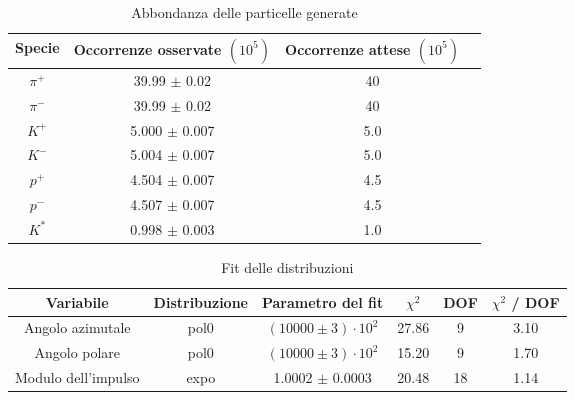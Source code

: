 \documentclass[a4paper,10pt,twocolumn]{article}
\begin{document}
\begin{table*}
  \caption{Abbondanza delle particelle generate}
  \label{tab:abbondanza}
  \centering
  \begin{tabular}{cccc}
    \toprule
    Specie  & Occorrenze osservate $(10^5)$ & Occorrenze attese $(10^5)$ \\
    \midrule
    $\pi^+$ & 39.99 $\pm$ 0.02              & 40                         \\
    $\pi^-$ & 39.99 $\pm$ 0.02              & 40                         \\
    $K^+$   & 5.000 $\pm$ 0.007             & 5.0                        \\
    $K^-$   & 5.004 $\pm$ 0.007             & 5.0                        \\
    $p^+$   & 4.504 $\pm$ 0.007             & 4.5                        \\
    $p^-$   & 4.507 $\pm$ 0.007             & 4.5                        \\
    $K^*$   & 0.998 $\pm$ 0.003             & 1.0                        \\
    \bottomrule
  \end{tabular}
\end{table*}


\begin{table*}
  \caption{Fit delle distribuzioni}
  \label{tab:fit}
  \centering
  \begin{tabular}{cccccc}
    \toprule
    Variabile           & Distribuzione & Parametro del fit          & $\chi^2$ & DOF & $\chi^2$ / DOF \\
    \midrule
    Angolo azimutale    & pol0          & $(10000 \pm 3) \cdot 10^2$ & 27.86    & 9   & 3.10           \\
    Angolo polare       & pol0          & $(10000 \pm 3) \cdot 10^2$ & 15.20    & 9   & 1.70           \\
    Modulo dell'impulso & expo          & 1.0002 $\pm$ 0.0003        & 20.48    & 18  & 1.14           \\
    \bottomrule
  \end{tabular}
\end{table*}
\end{document}
